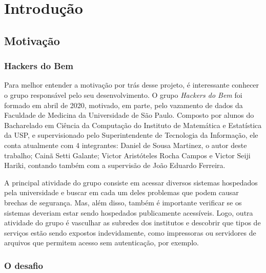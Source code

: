 
\chapter{Introdução}
\label{cap:introducao}



\section{Motivação}

\subsection{Hackers do Bem}
Para melhor entender a motivação por trás desse projeto, é interessante conhecer o grupo responsável pelo seu desenvolvimento. O grupo \textit{Hackers do Bem} foi formado em abril de 2020, motivado, em parte, pelo vazamento de dados da Faculdade de Medicina da Universidade de São Paulo. Composto por alunos do Bacharelado em Ciência da Computação do Instituto de Matemática e Estatística da USP, e supervisionado pelo Superintendente de Tecnologia da Informação, ele conta atualmente com 4 integrantes: Daniel de Sousa Martinez, o autor deste trabalho; Cainã Setti Galante; Victor Aristóteles Rocha Campos e Victor Seiji Hariki, contando também com a supervisão de João Eduardo Ferreira.

A principal atividade do grupo consiste em acessar diversos sistemas hospedados pela universidade e buscar em cada um deles problemas que podem causar brechas de segurança. Mas, além disso, também é importante verificar se os sistemas deveriam estar sendo hospedados publicamente acessíveis. Logo, outra atividade do grupo é vasculhar as subredes
dos institutos e descobrir que tipos de serviços estão sendo expostos indevidamente, como impressoras ou servidores de arquivos que permitem acesso sem autenticação, por exemplo. 


% 
\subsection{O desafio}

